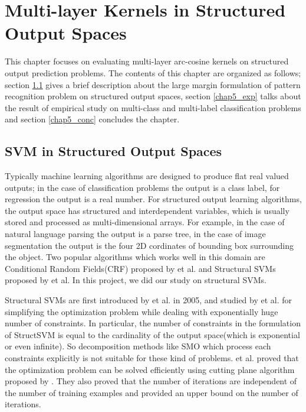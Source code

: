 \chapter{Multi-layer Kernels in Structured Output Spaces}
\label{chap_struct}

This chapter focuses on evaluating multi-layer arc-cosine kernels on structured output prediction problems. The contents of this chapter are organized as follows; section \ref{chap5_intro} gives a brief description about the large margin formulation of pattern recognition problem on structured output spaces, section \ref{chap5_exp} talks about the result of empirical study on multi-class and multi-label classification problems and section \ref{chap5_conc} concludes the chapter.

\section{SVM in Structured Output Spaces}
\label{chap5_intro}
Typically machine learning algorithms are designed to produce flat real valued outputs; in the case of classification problems the output is a class label, for regression the output is a real number. For structured output learning algorithms, the output space has structured and interdependent variables, which is usually stored and processed as multi-dimensional arrays. For example, in the case of natural language parsing the output is a parse tree, in the case of image segmentation the output is the four 2D cordinates of bounding box surrounding the object. Two popular algorithms which works well in this domain are Conditional Random Fields(CRF) proposed by \cite{crf} et al. and Structural SVMs proposed by \cite{joachims_struct} et al. In this project, we did our study on structural SVMs.

Structural SVMs are first introduced by \cite{joachims_struct} et al. in 2005, and  studied by \cite{joachims_cutting} et al. for simplifying the optimization problem while dealing with exponentially huge number of constraints. In particular, the number of constraints in the formulation of StructSVM is equal to the cardinality of the output space(which is exponential or even infinite). So decomposition methods like SMO which process each constraints explicitly is not suitable for these kind of problems. \cite{joachims_cutting} et al. proved that the optimization problem can be solved efficiently using cutting plane algorithm proposed by \cite{cutting_plane}. They also proved that the number of iterations are independent of the number of training examples and provided an upper bound on the number of iterations.  

